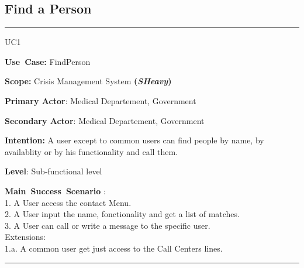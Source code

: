 \subsection{Find a Person}
\vspace{0.5cm}
\hrule
\vspace{0.5cm}
\begin{lyxlist}{UC1}
\small{
\item [\textbf{Use~Case:}] FindPerson
\item [\textbf{Scope:}] Crisis Management System \textbf{(\emph{SHeavy})}
\item [\textbf{Primary Actor}:] Medical Departement, Government
\item [\textbf{Secondary Actor}:] Medical Departement, Government
\item [\textbf{Intention:}]A user except to common users can find people by name, by availablity or by
his functionality and call them.
\item [\textbf{Level}:]Sub-functional level
\item [\textbf{Main~Success~Scenario}]:\\
1. A User access the contact Menu.\\
2. A User input the name, fonctionality and get a list of matches.\\
3. A User can call or write a message to the specific user.\\
Extensions:\\ 
	1.a. A common user get just access to the Call Centers lines.\\
}
\end{lyxlist}
\hrule 
\vspace{0.5cm} 

